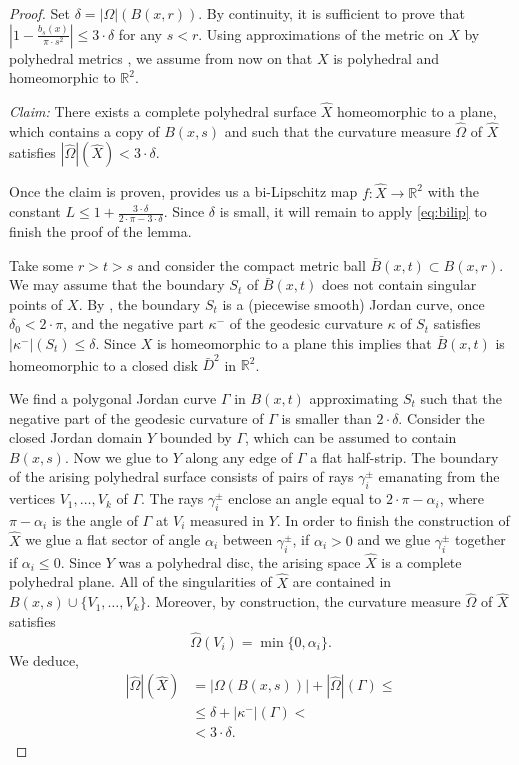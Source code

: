 \documentclass[12pt,leqno,intlimits]{amsart}
\numberwithin{equation}{section}
\theoremstyle{definition}
\theoremstyle{remark}
\newcommand{\R}{\mathbb{R}}
\def\:{\colon}
\begin{document}
\begin{proof}
{\color{red}
Set $\delta = |\Omega |( B (x,{r}))$. By continuity, it is sufficient to prove that $|1- \frac {b_s(x)} {\pi{\cdot}s^2}| \leq 3{\cdot}\delta $ for any $s<r$. Using approximations of
the metric on $X$ by polyhedral metrics \cite[Theorem 8.4.3, Theorem 8.1.9]{Reshetnyak-GeomIV}, we assume from now on that $X$ is polyhedral and homeomorphic to $\R^2$.

\emph{Claim:} There exists a complete polyhedral surface $\hat X$ homeomorphic to a plane, which contains a copy of $B (x,s)$ and such that
the curvature measure $\hat \Omega$ of $\hat X$ satisfies $|\hat \Omega | (\hat X) < 3 \cdot \delta$.

Once the claim is proven,
\cite{Bonk-Lang} provides us a bi-Lipschitz map $f\:\hat X\to \R^2$ with the constant $L\leq 1+\frac {3{\cdot}\delta} {2{\cdot}\pi -3{\cdot}\delta}$.
Since $\delta$ is small, it will remain to apply \eqref{eq:bilip} to finish the proof of the lemma.



Take some $r>t>s$ and consider the compact metric ball $\bar B (x,t) \subset B (x,r)$.
We may assume that the boundary $S_t$ of
$\bar B (x,t)$ does not contain singular points of $X$.
By \cite[Theorem 9.1, Theorem 9.3] {Reshetnyak-GeomIV}, the boundary $S_t$ is a (piecewise smooth) Jordan curve, once $\delta _0< 2{\cdot}\pi$, and the negative part $\kappa ^-$ of the geodesic curvature $\kappa$ of $S_t$ satisfies $|\kappa ^-| (S_t) \leq \delta$.
Since $X$ is homeomorphic to a plane this implies that $\bar B (x,t)$ is homeomorphic to a closed disk $\bar D^2$ in $\R^2$.

}

We find a polygonal Jordan curve $\Gamma$ in $B(x,t)$ approximating $S_t$ such that the negative part of the geodesic curvature of $\Gamma$ is smaller than $2{\cdot}\delta$. Consider the closed Jordan domain $Y$ bounded by $\Gamma$, which can be assumed to contain $B(x,s)$.
Now we glue to $Y$ along any edge of $\Gamma$ a flat half-strip.
The boundary of the arising polyhedral surface consists of pairs of rays
$\gamma _i ^{\pm}$ emanating from the vertices $V_1,\dots,V_k$ of $\Gamma$. The rays $\gamma _i^{\pm}$ enclose an angle equal to $2{\cdot}\pi- \alpha _i$, where $\pi-\alpha _i$ is the angle of $\Gamma$ at $V_i$ measured in $Y$. In order to finish the construction of $\hat X$ we glue a flat sector of
angle $\alpha _i$ between $\gamma _i ^{\pm}$, if $\alpha _i >0$ and we glue $\gamma _i^{\pm}$ together if $\alpha _i \leq 0$.
Since $Y$ was a polyhedral disc, the arising space $\hat X$ is a complete polyhedral plane.
All of the singularities of $\hat X$ are contained in $B(x,s) \cup \{ V_1,\dots, V_k\}$. Moreover, by construction, the curvature measure
$\hat \Omega$ of $\hat X$ satisfies
$$\hat \Omega (V_i) = \min \{ 0, \alpha _i \}.$$
We deduce,
\begin{align*}
|\hat \Omega | ( \hat X) &= |\Omega (B (x,s))| + |\hat \Omega | ( \Gamma ) \leq
\\
&\leq \delta + |\kappa ^-| (\Gamma ) <
\\
&< 3{\cdot}\delta.
\end{align*}



\end{proof}
\end{document}
